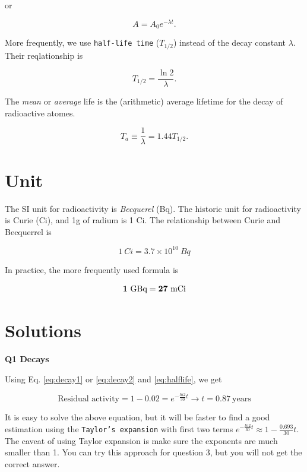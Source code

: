 \documentclass[]{book}
\theoremstyle{definition}
\theoremstyle{definition}
\theoremstyle{definition}
\theoremstyle{remark}
\begin{document}
or

\begin{equation}
A = A_0 e^{-\lambda t}. 
\label{eq:decay2}
\end{equation}

More frequently, we use \texttt{half-life\ time} (\(T_{1/2}\)) instead
of the decay constant \(\lambda\). Their reqlationship is

\begin{equation}
  T_{1/2} = \frac{\ln 2}{\lambda}.
  \label{eq:halflife}
\end{equation}

The \emph{mean} or \emph{average} life is the (arithmetic) average
lifetime for the decay of radioactive atomes.

\begin{equation}
  T_{a} \equiv \frac{1}{\lambda} = 1.44T_{1/2}.
    \label{eq:avelife}
\end{equation}

\section{Unit}\label{decay-unit}

The SI unit for radioactivity is \emph{Becquerel} (Bq). The historic
unit for radioactivity is Curie (Ci), and 1g of radium is 1 Ci. The
relationship between Curie and Becquerrel is

\begin{equation}
 1\ Ci = 3.7 \times 10^{10} \ Bq
 \label{eq:curie2bq}
\end{equation}

In practice, the more frequently used formula is

\begin{equation}
  \bold {1\ \text{GBq} = 27\ \text{mCi}}
\end{equation}

\section{Solutions}\label{nucl-solution}

\textbf{Q1 Decays}

Using Eq. \eqref{eq:decay1} or \eqref{eq:decay2} and \eqref{eq:halflife}, we
get

\[
\text{Residual activity} = 1-0.02 = e^{-\frac{ln2}{30}t} \rightarrow \boxed{t =0.87\ \text{years}}
\]

It is easy to solve the above equation, but it will be faster to find a
good estimation using the \texttt{Taylor’s\ expansion} with first two
terms \(e^{-\frac{ln2}{30}t} \approx 1-\frac{0.693}{30}t\). The caveat
of using Taylor expansion is make sure the exponents are much smaller
than 1. You can try this approach for question 3, but you will not get
the correct answer.
\end{document}
